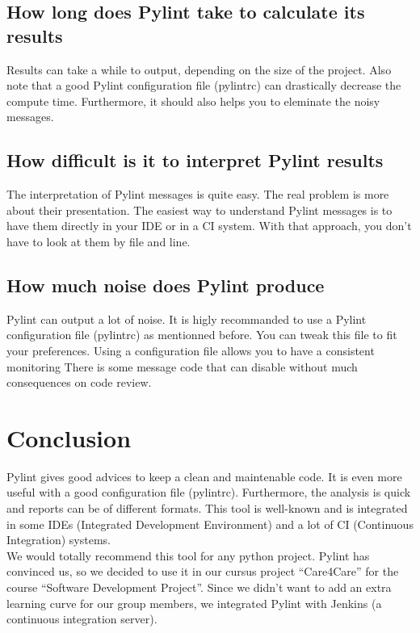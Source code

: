 \documentclass[12pt, a4paper]{article}
\newcommand{\pyl}{\textsf{Pylint}}
\begin{document}
\subsection*{How long does \pyl{} take to calculate its results}

Results can take a while to output, depending on the size of the project.
Also note that a good \pyl{} configuration file (pylintrc) can drastically decrease the compute time.
Furthermore, it should also helps you to eleminate the noisy messages.

\subsection*{How difficult is it to interpret \pyl{} results}

The interpretation of \pyl{} messages is quite easy.
The real problem is more about their presentation.
The easiest way to understand \pyl{} messages is to have them directly in your IDE or in a CI system.
With that approach, you don't have to look at them by file and line.

\subsection*{How much noise does \pyl{} produce}

\pyl{} can output a lot of noise.
It is higly recommanded to use a \pyl{} configuration file (pylintrc) as mentionned before.
You can tweak this file to fit your preferences.
Using a configuration file allows you to have a consistent monitoring
There is some message code that can disable without much consequences on code review.

\section*{Conclusion}

\pyl{} gives good advices to keep a clean and maintenable code.
It is even more useful with a good configuration file (pylintrc).
Furthermore, the analysis is quick and reports can be of different formats.
This tool is well-known and is integrated in some IDEs (Integrated Development Environment) and a lot of CI (Continuous Integration) systems.\\


We would totally recommend this tool for any python project.
\pyl{} has convinced us, so we decided to use it in our cursus project ``Care4Care'' for the course ``Software Development Project''.  
Since we didn't want to add an extra learning curve for our group members, we integrated \pyl{} with Jenkins (a continuous integration server).
\end{document}
